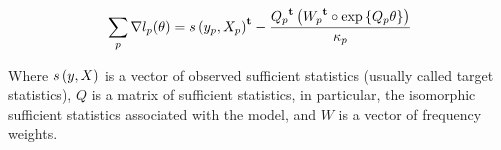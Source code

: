 \documentclass[12pt]{article}
\begin{document}
\begin{equation}
\sum_{p}\nabla l_p(\theta) = {s\left(y_p, X_p\right)}^\mathbf{t} - \frac{{Q_p}^\mathbf{t}\left({W_p}^\mathbf{t} \circ \mbox{exp}\left\{Q_p \theta\right\}\right)}{\kappa_p}
\end{equation}

Where $s\left(y, X\right)$ is a vector of observed sufficient statistics (usually called target statistics), $Q$ is a matrix of sufficient statistics, in particular, the isomorphic sufficient statistics associated with the model, and $W$ is a vector of frequency weights.
\end{document}
